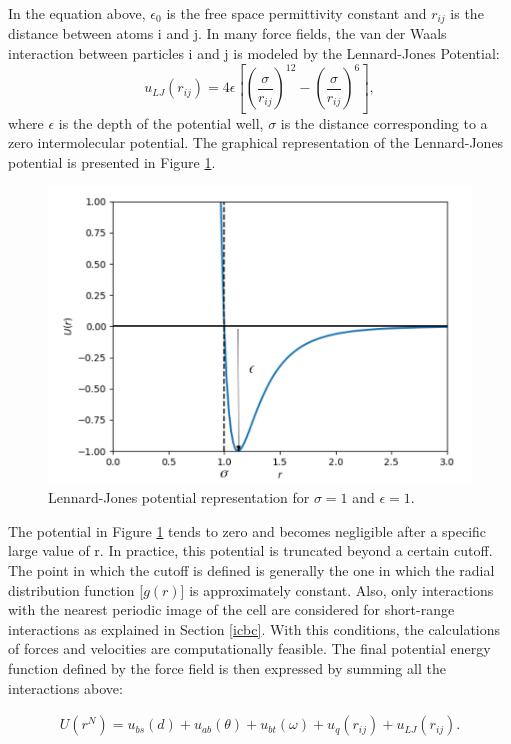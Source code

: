 In the equation above, $\epsilon _{0}$ is the free space permittivity constant and $r_{ij}$ is the distance between atoms i and j. In many force fields, the van der Waals interaction between particles i and j is modeled by the Lennard-Jones Potential:
\begin{equation}
u_{LJ}(r_{ij}) = 4 \epsilon
\left[ \left(\frac{\sigma}{r_{ij}} \right)^{12} - \left(\frac{\sigma}{r_{ij}} \right)^{6} \right],
\end{equation}
where  $\epsilon$ is the depth of the potential well, $\sigma$ is the distance corresponding to a zero intermolecular potential. The graphical representation of the Lennard-Jones potential is presented in Figure \ref{fig:lj}.
\begin{figure}[H]
	\centering
	\includegraphics[width=0.8\linewidth]{Figures/lj2}
	\caption{Lennard-Jones potential representation for $\sigma = 1$ and $\epsilon = 1$. }
	\label{fig:lj}
\end{figure}

The potential in Figure \ref{fig:lj} tends to zero and becomes negligible after a specific large value of r. In practice, this potential is truncated beyond a certain cutoff. The point in which the cutoff is defined is generally the one in which the radial distribution function [$g(r)$] is approximately constant. Also, only interactions with the nearest periodic image of the cell are considered for short-range interactions as explained in Section \ref{icbc}. With this conditions, the calculations of forces and velocities are computationally feasible. The final potential energy function defined by the force field is then expressed by summing all the interactions above:

\begin{equation}
\begin{aligned}
U(r^N) = u_{bs}(d) + u_{ab}(\theta) + u_{bt}(\omega) + u_{q}(r_{ij}) + u_{LJ}(r_{ij}) .
\end{aligned}
\end{equation}


